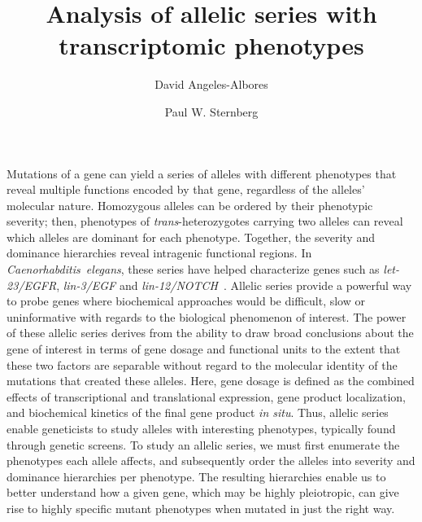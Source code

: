 \documentclass[9pt,twocolumn,twoside]{gsajnl}
\title{Analysis of allelic series with transcriptomic phenotypes}
\author[$\dagger$]{David Angeles-Albores}
\author[$\dagger$,1]{Paul W. Sternberg}
\affil[$\dagger$]{Division of Biology and Biological Engineering, Caltech,
Pasadena, CA, 91125, USA}
\newcommand{\gene}[1]{\mbox{\emph{#1}}}
\begin{document}
\maketitle{}
\thispagestyle{firststyle}
\marginmark{}
\firstpagefootnote{}
\vspace{-11pt}%

\linenumbers{}
\lettrine[lines=2]{\color{color2}M}{}utations of a gene can yield a series of
alleles with different phenotypes that reveal multiple functions encoded by that
gene, regardless of the alleles' molecular nature. Homozygous alleles can be
ordered by their phenotypic severity; then, phenotypes of
\emph{trans}-heterozygotes carrying two alleles can reveal which alleles are
dominant for each phenotype. Together, the severity and dominance hierarchies
reveal intragenic functional regions. In \emph{Caenorhabditis~elegans}, these
series have helped characterize  genes such as \gene{let-23/EGFR},
\gene{lin-3/EGF} and \gene{lin-12/NOTCH}~\citep{Aroian1991, Ferguson1985a,
Greenwald1983}. Allelic series provide a powerful way to probe genes where
biochemical approaches would be difficult, slow or uninformative with regards to
the biological phenomenon of interest. The power of these allelic series derives
from the ability to draw broad conclusions about the gene of interest in terms
of gene dosage and functional units to the extent that these two factors are
separable without regard to the molecular identity of the mutations that created
these alleles. Here, gene dosage is defined as the combined effects of
transcriptional and translational expression, gene product localization, and
biochemical kinetics of the final gene product \emph{in situ}. Thus, allelic
series enable geneticists to study alleles with interesting phenotypes,
typically found through genetic screens. To study an allelic series, we must
first enumerate the phenotypes each allele affects, and subsequently order the
alleles into severity and dominance hierarchies per phenotype. The resulting
hierarchies enable us to better understand how a given gene, which may be highly
pleiotropic, can give rise to highly specific mutant phenotypes when mutated in
just the right way.
\end{document}
